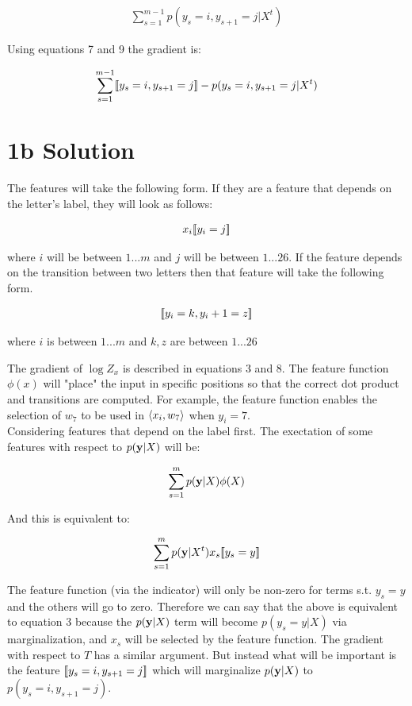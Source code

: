 \documentclass[11pt]{report}
\begin{document}
	\begin{align}
	 \sum_{s=1}^{m-1} {p(y_s=i, y_{s+1}=j | X^t)}
	\end{align}


	Using equations 7 and 9 the gradient is:

	\begin{align}
	\sum_{s=1}^{m-1} [\![y_s = i, y_{s+1} = j]\!] - p(y_s=i, y_{s+1}=j | X^t)
	\end{align}
	

\section*{1b Solution}

The features will take the following form. If they are a feature that depends on the letter's label, they will look as follows:


	\begin{align}
	x_i [\![y_i=j]\!]
	\end{align}

where $i$ will be between $1...m$ and $j$ will be between $1...26$. If the feature depends on the transition between two letters then that feature will take the following form. 


	\begin{align}
	[\![y_i = k, y_i+1 = z]\!]
	\end{align}

where $i$ is between $1...m$ and $k, z$ are between $1...26$

The gradient of $\log Z_x$ is described in equations 3 and 8. The feature function $\phi(x)$ will "place" the input in specific positions so that the correct dot product and transitions are computed. 
For example, the feature function enables the selection of $w_7$ to be used in $\left\langle x_i,w_7 \right\rangle$ when $y_i = 7$. \\

Considering features that depend on the label first. The exectation of some features with respect to $p(\mathbf{\boldsymbol{y}}|X)$ will be:

	\begin{align}
	\sum_{s=1}^{m} p(\mathbf{\boldsymbol{y}}|X)\phi(X)
	\end{align}

And this is equivalent to:

	\begin{align}
	\sum_{s=1}^{m} p(\mathbf{\boldsymbol{y}}|X^t)x_s [\![y_s=y]\!]
	\end{align}

The feature function (via the indicator) will only be non-zero for terms s.t. $y_s=y$ and the others will go to zero. Therefore we can say that the above is equivalent to equation 3 because the 
$p(\mathbf{\boldsymbol{y}}|X)$ term will become $p(y_s=y|X)$ via marginalization, and $x_s$ will be selected by the feature function. The gradient with respect to $T$ has a similar argument. But instead what will be 
important is the feature $[\![y_s = i, y_{s+1} = j]\!]$ which will marginalize $p(\mathbf{\boldsymbol{y}}|X)$ to $p(y_s=i,y_{s+1}=j)$. 
	
\end{document}
